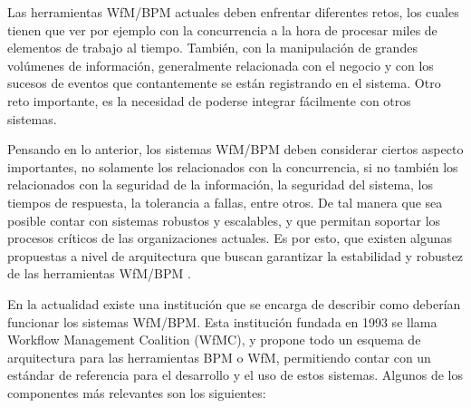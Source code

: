 Las herramientas WfM/BPM actuales deben enfrentar diferentes retos, los cuales tienen que ver por ejemplo con la concurrencia a la hora de procesar miles de elementos de trabajo al tiempo. También, con la manipulación de grandes volúmenes de información, generalmente relacionada con el negocio y con los sucesos de eventos que contantemente se están registrando en el sistema. Otro reto importante, es la necesidad de poderse integrar fácilmente con otros sistemas. 

Pensando en lo anterior, los sistemas WfM/BPM deben considerar ciertos aspecto importantes, no solamente los relacionados con la concurrencia, si no también los relacionados con la seguridad de la información, la seguridad del sistema, los tiempos de respuesta, la tolerancia a fallas, entre otros. De tal manera que sea posible contar con sistemas robustos y escalables, y que permitan soportar los procesos críticos de las organizaciones actuales. Es por esto, que existen algunas propuestas a nivel de arquitectura que buscan garantizar la estabilidad y robustez de las herramientas WfM/BPM \cite{VanderAalst2013}. 

En la actualidad existe una institución que se encarga de describir como deberían funcionar los sistemas WfM/BPM. Esta institución fundada en 1993 se llama Workflow Management Coalition (WfMC), y propone todo un esquema de arquitectura para las herramientas BPM o WfM, permitiendo contar con un estándar de referencia para el desarrollo y el uso de estos sistemas. Algunos de los componentes más relevantes son los siguientes: 

